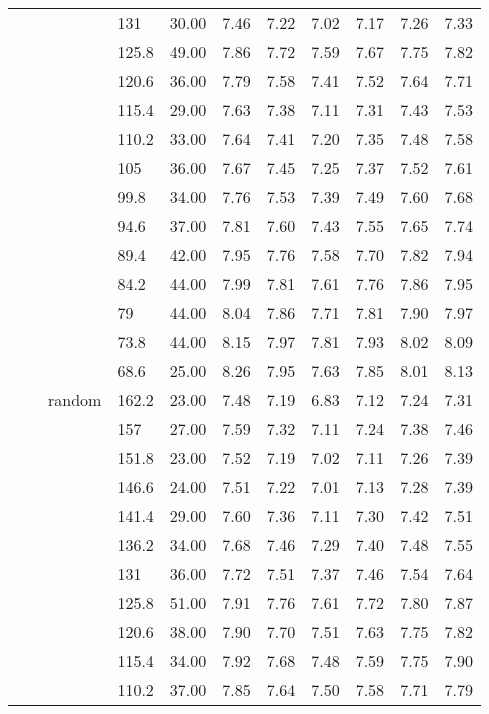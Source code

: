 \begin{longtable}{llllrrrrrrr}
   &  &  & 131 & 30.00 & 7.46 & 7.22 & 7.02 & 7.17 & 7.26 & 7.33 \\ 
   &  &  & 125.8 & 49.00 & 7.86 & 7.72 & 7.59 & 7.67 & 7.75 & 7.82 \\ 
   &  &  & 120.6 & 36.00 & 7.79 & 7.58 & 7.41 & 7.52 & 7.64 & 7.71 \\ 
   &  &  & 115.4 & 29.00 & 7.63 & 7.38 & 7.11 & 7.31 & 7.43 & 7.53 \\ 
   &  &  & 110.2 & 33.00 & 7.64 & 7.41 & 7.20 & 7.35 & 7.48 & 7.58 \\ 
   &  &  & 105 & 36.00 & 7.67 & 7.45 & 7.25 & 7.37 & 7.52 & 7.61 \\ 
   &  &  & 99.8 & 34.00 & 7.76 & 7.53 & 7.39 & 7.49 & 7.60 & 7.68 \\ 
   &  &  & 94.6 & 37.00 & 7.81 & 7.60 & 7.43 & 7.55 & 7.65 & 7.74 \\ 
   &  &  & 89.4 & 42.00 & 7.95 & 7.76 & 7.58 & 7.70 & 7.82 & 7.94 \\ 
   &  &  & 84.2 & 44.00 & 7.99 & 7.81 & 7.61 & 7.76 & 7.86 & 7.95 \\ 
   &  &  & 79 & 44.00 & 8.04 & 7.86 & 7.71 & 7.81 & 7.90 & 7.97 \\ 
   &  &  & 73.8 & 44.00 & 8.15 & 7.97 & 7.81 & 7.93 & 8.02 & 8.09 \\ 
   &  &  & 68.6 & 25.00 & 8.26 & 7.95 & 7.63 & 7.85 & 8.01 & 8.13 \\ 
   &  & random & 162.2 & 23.00 & 7.48 & 7.19 & 6.83 & 7.12 & 7.24 & 7.31 \\ 
   &  &  & 157 & 27.00 & 7.59 & 7.32 & 7.11 & 7.24 & 7.38 & 7.46 \\ 
   &  &  & 151.8 & 23.00 & 7.52 & 7.19 & 7.02 & 7.11 & 7.26 & 7.39 \\ 
   &  &  & 146.6 & 24.00 & 7.51 & 7.22 & 7.01 & 7.13 & 7.28 & 7.39 \\ 
   &  &  & 141.4 & 29.00 & 7.60 & 7.36 & 7.11 & 7.30 & 7.42 & 7.51 \\ 
   &  &  & 136.2 & 34.00 & 7.68 & 7.46 & 7.29 & 7.40 & 7.48 & 7.55 \\ 
   &  &  & 131 & 36.00 & 7.72 & 7.51 & 7.37 & 7.46 & 7.54 & 7.64 \\ 
   &  &  & 125.8 & 51.00 & 7.91 & 7.76 & 7.61 & 7.72 & 7.80 & 7.87 \\ 
   &  &  & 120.6 & 38.00 & 7.90 & 7.70 & 7.51 & 7.63 & 7.75 & 7.82 \\ 
   &  &  & 115.4 & 34.00 & 7.92 & 7.68 & 7.48 & 7.59 & 7.75 & 7.90 \\ 
   &  &  & 110.2 & 37.00 & 7.85 & 7.64 & 7.50 & 7.58 & 7.71 & 7.79 \\ 

\end{longtable}
